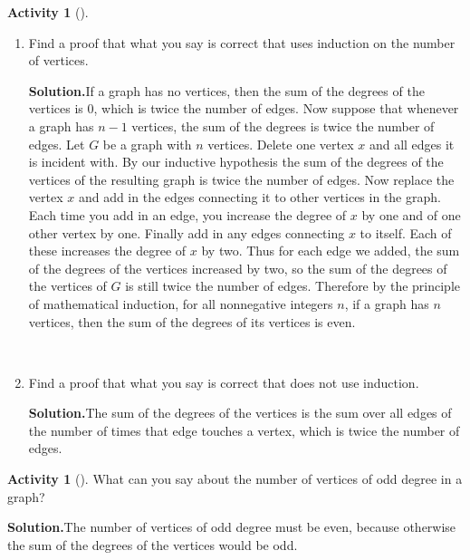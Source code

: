 \documentclass[10pt,]{book}
\theoremstyle{plain}
\theoremstyle{definition}
\newtheorem{activity}[project]{Activity}
\numberwithin{equation}{chapter}
\begin{document}
\begin{activity}[]
\begin{enumerate}[label=(\alph*)]
~\par
\item Find a proof that what you say is correct that uses induction on the number of vertices.%
\par\medskip\noindent%
\textbf{Solution.}\quad If a graph has no vertices, then the sum of the degrees of the vertices is 0, which is twice the number of edges. Now suppose that whenever a graph has \(n-1\) vertices, the sum of the degrees is twice the number of edges. Let \(G\) be a graph with \(n\) vertices. Delete one vertex \(x\) and all edges it is incident with. By our inductive hypothesis the sum of the degrees of the vertices of the resulting graph is twice the number of edges. Now replace the vertex \(x\) and add in the edges connecting it to other vertices in the graph. Each time you add in an edge, you increase the degree of \(x\) by one and of one other vertex by one. Finally add in any edges connecting \(x\) to itself. Each of these increases the degree of \(x\) by two. Thus for each edge we added, the sum of the degrees of the vertices increased by two, so the sum of the degrees of the vertices of \(G\) is still twice the number of edges. Therefore by the principle of mathematical induction, for all nonnegative integers \(n\), if a graph has \(n\) vertices, then the sum of the degrees of its vertices is even.%

~\par
\item Find a proof that what you say is correct that does not use induction.%
\par\medskip\noindent%
\textbf{Solution.}\quad The sum of the degrees of the vertices is the sum over all edges of the number of times that edge touches a vertex, which is twice the number of edges.%

\end{enumerate}
\end{activity}
\begin{activity}[]\label{activity-95}
What can you say about the number of vertices of odd degree in a graph?%
\par\medskip\noindent%
\textbf{Solution.}\quad The number of vertices of odd degree must be even, because otherwise the sum of the degrees of the vertices would be odd.%
\end{activity}
\typeout{************************************************}
\typeout{************************************************}
\end{document}
